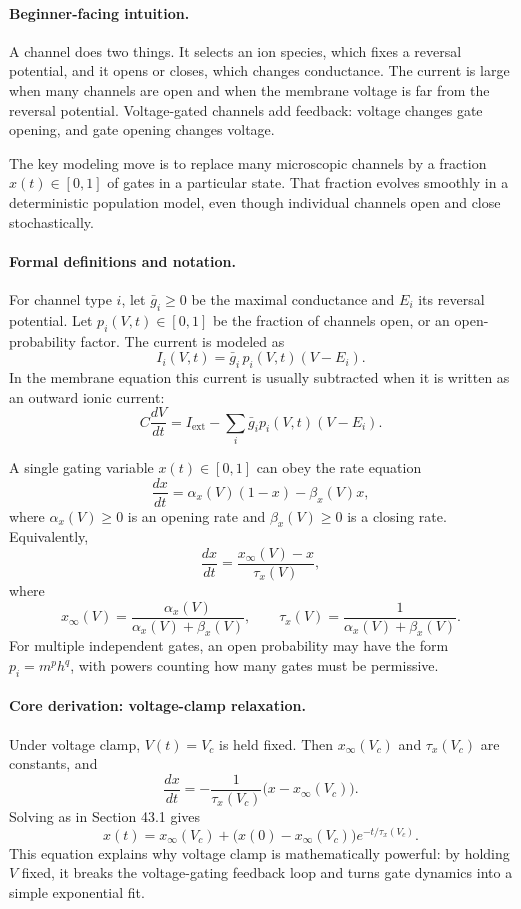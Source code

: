 \paragraph{Beginner-facing intuition.}
A channel does two things. It selects an ion species, which fixes a reversal potential, and it opens or closes, which changes conductance. The current is large when many channels are open and when the membrane voltage is far from the reversal potential. Voltage-gated channels add feedback: voltage changes gate opening, and gate opening changes voltage.

The key modeling move is to replace many microscopic channels by a fraction \(x(t)\in[0,1]\) of gates in a particular state. That fraction evolves smoothly in a deterministic population model, even though individual channels open and close stochastically.

\paragraph{Formal definitions and notation.}
For channel type \(i\), let \(\bar g_i\geq0\) be the maximal conductance and \(E_i\) its reversal potential. Let \(p_i(V,t)\in[0,1]\) be the fraction of channels open, or an open-probability factor. The current is modeled as
\[
I_i(V,t)=\bar g_i\,p_i(V,t)(V-E_i).
\]
In the membrane equation this current is usually subtracted when it is written as an outward ionic current:
\[
C\frac{dV}{dt}=I_{\mathrm{ext}}-\sum_i \bar g_i p_i(V,t)(V-E_i).
\]

A single gating variable \(x(t)\in[0,1]\) can obey the rate equation
\[
\frac{dx}{dt}=\alpha_x(V)(1-x)-\beta_x(V)x,
\]
where \(\alpha_x(V)\geq0\) is an opening rate and \(\beta_x(V)\geq0\) is a closing rate. Equivalently,
\[
\boxed{\frac{dx}{dt}=\frac{x_\infty(V)-x}{\tau_x(V)},}
\]
where
\[
x_\infty(V)=\frac{\alpha_x(V)}{\alpha_x(V)+\beta_x(V)},
\qquad
\tau_x(V)=\frac{1}{\alpha_x(V)+\beta_x(V)}.
\]
For multiple independent gates, an open probability may have the form \(p_i=m^p h^q\), with powers counting how many gates must be permissive.

\paragraph{Core derivation: voltage-clamp relaxation.}
Under voltage clamp, \(V(t)=V_c\) is held fixed. Then \(x_\infty(V_c)\) and \(\tau_x(V_c)\) are constants, and
\[
\frac{dx}{dt}=-\frac{1}{\tau_x(V_c)}\bigl(x-x_\infty(V_c)\bigr).
\]
Solving as in Section 43.1 gives
\[
\boxed{x(t)=x_\infty(V_c)+\bigl(x(0)-x_\infty(V_c)\bigr)e^{-t/\tau_x(V_c)}.}
\]
This equation explains why voltage clamp is mathematically powerful: by holding \(V\) fixed, it breaks the voltage-gating feedback loop and turns gate dynamics into a simple exponential fit.

